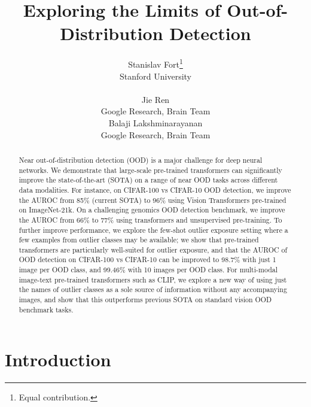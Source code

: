 \documentclass{article}
\title{
Exploring the Limits of Out-of-Distribution Detection }
\author{Stanislav Fort\thanks{Equal contribution.}
\\
Stanford University\\
\email{sfort1@stanford.edu} \\
\And
Jie Ren\footnotemark[1] \\
Google Research, Brain Team \\
\email{jjren@google.com}
\And
Balaji Lakshminarayanan
\\
Google Research, Brain Team \\
\email{balajiln@google.com}
}
\begin{document}
\maketitle
\vspace{-1em}
\begin{abstract}
Near out-of-distribution detection (OOD) is a major challenge for deep neural networks. We demonstrate that 
large-scale pre-trained transformers can significantly improve the state-of-the-art (SOTA) on a range of near OOD tasks across different data modalities. For instance, on CIFAR-100 vs CIFAR-10 OOD detection, we improve the AUROC from 85\% (current SOTA) to 96\% using Vision Transformers pre-trained on ImageNet-21k. On a challenging genomics OOD detection benchmark, we improve the AUROC from 66\% to 77\% using transformers and unsupervised pre-training. 
To further improve performance, we explore the few-shot outlier exposure setting where a few examples from outlier classes may be available; we show that  
pre-trained transformers are particularly well-suited for outlier exposure, and that the AUROC of OOD detection on CIFAR-100 vs CIFAR-10  can be improved to 98.7\% with just 1 image per OOD class, and 99.46\% with 10 images per OOD class. 
For multi-modal image-text pre-trained transformers such as CLIP, we explore a new way of using just the names of outlier classes as a sole source of information without any accompanying images, and show that this outperforms previous SOTA on standard vision OOD benchmark tasks. 
 


\end{abstract}

\vspace{-1em}
\section{Introduction}
\end{document}
